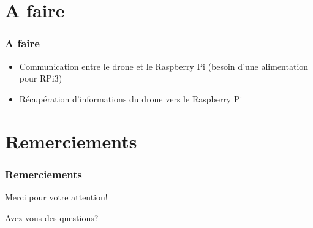 \documentclass[12pt]{beamer}
\begin{document}
	\section{A faire}
	\begin{frame}
	\frametitle{A faire}
	    \begin{alertblock}{}
    	    \begin{itemize}
    	    [triangle]
    	        \item Communication entre le drone et le Raspberry Pi (besoin d'une alimentation pour RPi3)
    	        \item Récupération d'informations du drone vers le Raspberry Pi
    	    \end{itemize}
	    \end{alertblock}
	\end{frame}
	\section*{Remerciements}
	\begin{frame}
	\frametitle{Remerciements}
		\begin{center}
		Merci pour votre attention!

		\bigbreak
		Avez-vous des questions?
		\end{center}
	\end{frame}
	
\end{document}
